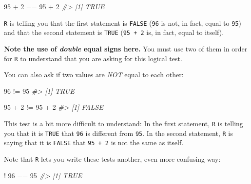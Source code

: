 \documentclass[
]{book}
\newenvironment{Shaded}{\begin{snugshade}}{\end{snugshade}}
\newcommand{\CommentTok}[1]{\textcolor[rgb]{0.56,0.35,0.01}{\textit{#1}}}
\newcommand{\DecValTok}[1]{\textcolor[rgb]{0.00,0.00,0.81}{#1}}
\newcommand{\SpecialCharTok}[1]{\textcolor[rgb]{0.00,0.00,0.00}{#1}}
\begin{document}
\begin{Shaded}
\begin{Highlighting}[]
\DecValTok{95} \SpecialCharTok{+} \DecValTok{2} \SpecialCharTok{==} \DecValTok{95} \SpecialCharTok{+} \DecValTok{2}
\CommentTok{\#\textgreater{} [1] TRUE}
\end{Highlighting}
\end{Shaded}

\texttt{R} is telling you that the first statement is \texttt{FALSE} (\texttt{96} is not, in fact, equal to \texttt{95}) and that the second statement is \texttt{TRUE} (\texttt{95\ +\ 2} is, in fact, equal to itself).

\textbf{Note the use of \emph{double} equal signs here.} You must use two of them in order for \texttt{R} to understand that you are asking for this logical test.

You can also ask if two values are \emph{NOT} equal to each other:

\begin{Shaded}
\begin{Highlighting}[]
\DecValTok{96} \SpecialCharTok{!=} \DecValTok{95}
\CommentTok{\#\textgreater{} [1] TRUE}
\end{Highlighting}
\end{Shaded}

\begin{Shaded}
\begin{Highlighting}[]
\DecValTok{95} \SpecialCharTok{+} \DecValTok{2} \SpecialCharTok{!=} \DecValTok{95} \SpecialCharTok{+} \DecValTok{2}
\CommentTok{\#\textgreater{} [1] FALSE}
\end{Highlighting}
\end{Shaded}

This test is a bit more difficult to understand: In the first statement, \texttt{R} is telling you that it is \texttt{TRUE} that \texttt{96} is different from \texttt{95}. In the second statement, \texttt{R} is saying that it is \texttt{FALSE} that \texttt{95\ +\ 2} is not the same as itself.

Note that \texttt{R} lets you write these tests another, even more confusing way:

\begin{Shaded}
\begin{Highlighting}[]
\SpecialCharTok{!} \DecValTok{96} \SpecialCharTok{==} \DecValTok{95}
\CommentTok{\#\textgreater{} [1] TRUE}
\end{Highlighting}
\end{Shaded}
\end{document}

